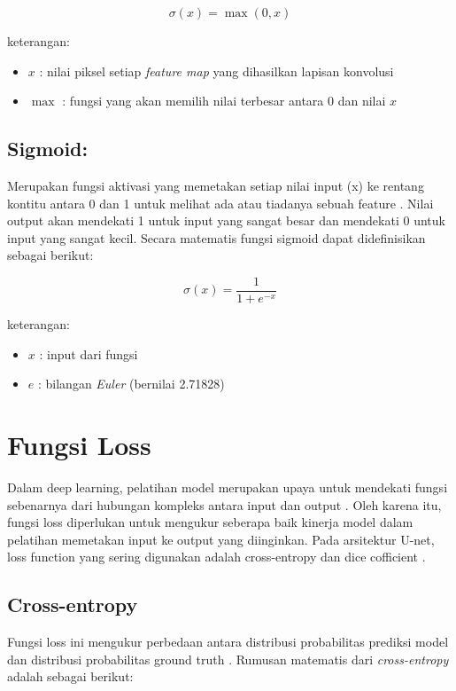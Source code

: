 \begin{equation}
	\sigma(x) = \max(0, x)
\end{equation}

\noindent
keterangan:
\begin{itemize}
	\item $x$ : nilai piksel setiap \textit{feature map} yang dihasilkan lapisan konvolusi
	\item $\max$ : fungsi yang akan memilih nilai terbesar antara 0 dan nilai $x$
\end{itemize}

\subsection{Sigmoid:}
Merupakan fungsi aktivasi yang memetakan setiap nilai input (x) ke rentang kontitu antara 0 dan 1 untuk melihat ada atau tiadanya sebuah feature \cite{younisse_fine-tuning_2023}. Nilai output akan mendekati 1 untuk input yang sangat besar dan mendekati 0 untuk input yang sangat kecil. Secara matematis fungsi sigmoid dapat didefinisikan sebagai berikut:

\begin{equation}
	\sigma(x) = \frac{1}{1 + e^{-x}}
\end{equation}

\noindent
keterangan:
\begin{itemize}
	\item $x$ : input dari fungsi
	\item $e$ : bilangan \textit{Euler} (bernilai 2.71828)
\end{itemize}


\section{Fungsi Loss}

\noindent Dalam deep learning, pelatihan model merupakan upaya untuk mendekati fungsi sebenarnya dari hubungan kompleks antara input dan output \cite{dawani_hands-mathematics_2020}. Oleh karena itu, fungsi loss diperlukan untuk mengukur seberapa baik kinerja model dalam pelatihan memetakan input ke output yang diinginkan. Pada arsitektur U-net, loss function yang sering digunakan adalah cross-entropy dan dice cofficient \cite{huang_fully_2022}.  

\subsection{Cross-entropy} Fungsi loss ini mengukur perbedaan antara distribusi probabilitas prediksi model dan distribusi probabilitas ground truth \cite{herrera_impact_2022}. Rumusan matematis dari \textit{cross-entropy} adalah sebagai berikut:

